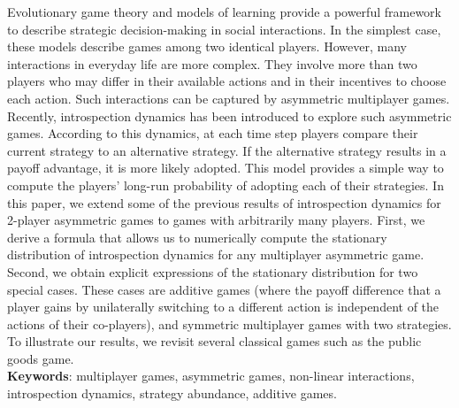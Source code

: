 \documentclass[11pt]{article}
\theoremstyle{plainCl1}
\theoremstyle{plainCl2}
\begin{document}
Evolutionary game theory and models of learning provide a powerful framework to describe strategic decision-making in social interactions. 
In the simplest case, these models describe games among two identical players. 
However, many interactions in everyday life are more complex. 
They involve more than two players who may differ in their available actions and in their incentives to choose each action. 
Such interactions can be captured by asymmetric multiplayer games. 
Recently, introspection dynamics has been introduced to explore such asymmetric games. 
According to this dynamics, at each time step players compare their current strategy to an alternative strategy. 
If the alternative strategy results in a payoff advantage, it is more likely adopted. 
This model provides a simple way to compute the players’ long-run probability of adopting each of their strategies. 
In this paper, we extend some of the previous results of introspection dynamics for 2-player asymmetric games to games with arbitrarily many players. 
First, we derive a formula that allows us to numerically compute the stationary distribution of introspection dynamics for any multiplayer asymmetric game. 
Second, we obtain explicit expressions of the stationary distribution for two special cases. These cases are additive games (where the payoff difference that a player gains by unilaterally switching to a different action is independent of the actions of their co-players), and symmetric multiplayer games with two strategies. 
To illustrate our results, we revisit several classical games such as the public goods game.\\


\noindent \textbf{Keywords}: multiplayer games, asymmetric games, non-linear interactions, introspection dynamics, strategy abundance, additive games.
\end{document}
